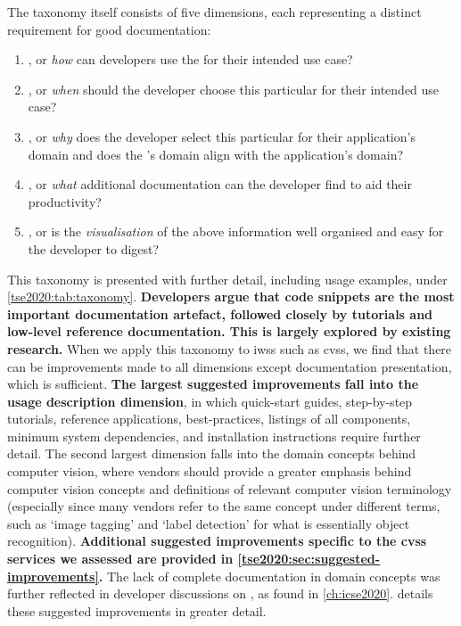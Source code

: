 The taxonomy itself consists of five dimensions, each representing a distinct requirement for good  documentation: 
\begin{enumerate}[label=\textbf{(\roman*)}]
	\item \dima{}, or \textit{how} can developers use the  for their intended use case? 
	\item \dimb{}, or \textit{when} should the developer choose this particular  for their intended use case?
	\item \dimc{}, or \textit{why} does the developer select this particular  for their application's domain and does the 's domain align with the application's domain?
	\item \dimd{}, or \textit{what} additional  documentation can the developer find to aid their productivity?
	\item \dime{}, or is the \textit{visualisation} of the above information well organised and easy for the developer to digest?
\end{enumerate} 
 This taxonomy is presented with further detail, including usage examples, under \cref{tse2020:tab:taxonomy}. \textbf{Developers argue that code snippets are the most important documentation artefact, followed closely by tutorials and low-level reference documentation. This is largely explored by existing research.}
When we apply this taxonomy to \glspl{iws} such as \glspl{cvs}, we find that there can be improvements made to all dimensions except documentation presentation, which is sufficient. \textbf{The largest suggested improvements fall into the usage description dimension}, in which quick-start guides, step-by-step tutorials, reference applications, best-practices, listings of all  components, minimum system dependencies, and installation instructions require further detail. The second largest dimension falls into the domain concepts behind computer vision, where vendors should provide a greater emphasis behind computer vision concepts and definitions of relevant computer vision terminology (especially since many vendors refer to the same concept under different terms, such as `image tagging' and `label detection' for what is essentially object recognition). \textbf{Additional suggested improvements specific to the \glspl{cvs} services we assessed are provided in \cref{tse2020:sec:suggested-improvements}.} The lack of complete documentation in domain concepts was further reflected in developer discussions on , as found in \cref{ch:icse2020}.  details these suggested improvements in greater detail.

